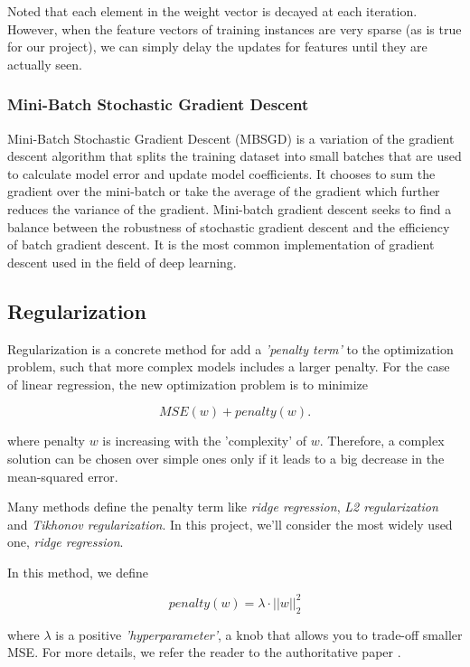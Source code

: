\documentclass[sigconf]{acmart}
\begin{document}
Noted that each element in the weight vector is decayed at each iteration. However, when the feature vectors of training instances are very sparse (as is true for our project), we can simply delay the updates for features until they are actually seen. 

\subsubsection{Mini-Batch Stochastic Gradient Descent}
\label{subsection:logisticMBSGD}

Mini-Batch Stochastic Gradient Descent (MBSGD) \cite{ioffe2015batch} is a variation of the gradient descent algorithm that splits the training dataset into small batches that are used to calculate model error and update model coefficients. It chooses to sum the gradient over the mini-batch or take the average of the gradient which further reduces the variance of the gradient. Mini-batch gradient descent seeks to find a balance between the robustness of stochastic gradient descent and the efficiency of batch gradient descent. It is the most common implementation of gradient descent used in the field of deep learning.

\subsection{Regularization}
\label{subsection:regularization}

Regularization is a concrete method for add a \textit{'penalty term'} to the optimization problem, such that more complex models includes a larger penalty. For the case of linear regression, the new optimization problem is to minimize

$$
MSE(w) + penalty(w).
$$

where penalty $w$ is increasing with the 'complexity' of $w$. Therefore, a complex solution can be chosen over simple ones only if it leads to a big decrease in the mean-squared error.

Many methods define the penalty term like \textit{ridge regression}, \textit{L2 regularization} and \textit{Tikhonov regularization}. In this project, we'll consider the most widely used one, \textit{ridge regression}.

In this method, we define

$$
penalty(w) = \lambda \cdot ||w||^2_2
$$

where $\lambda$ is a positive \textit{'hyperparameter'}, a knob that allows you to trade-off smaller MSE. For more details, we refer the reader to the authoritative paper \cite{nasrabadi2007pattern}. 
\end{document}
